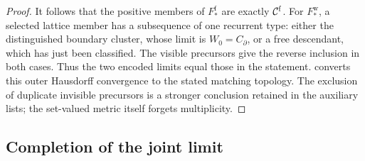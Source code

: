 \begin{proof}
It follows that the positive members of \(F_*^{\mathrm f}\) are
exactly \(\mathcal C^{\rm f}\). For \(F_*^{\mathrm w}\), a selected lattice
member has a subsequence of one recurrent type: either the distinguished boundary cluster, whose limit is
\(W_0=C_\partial\), or a free descendant, which has just been classified.
The visible precursors give the reverse inclusion in both cases.
Thus the two encoded limits equal those in the statement.
 converts this outer Hausdorff convergence
to the stated matching topology. The exclusion of duplicate invisible
precursors is a stronger conclusion retained in the auxiliary lists;
the set-valued metric itself forgets multiplicity.
\end{proof}

\subsection{Completion of the joint limit}

